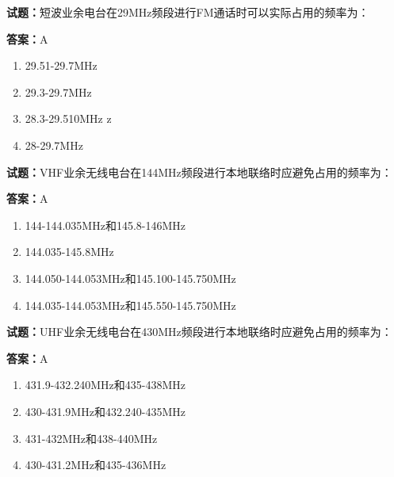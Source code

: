 \documentclass{ctexbook}
\begin{document}




\vspace{1em}

\textbf{试题：}短波业余电台在29MHz频段进行FM通话时可以实际占用的频率为： 

\textbf{答案：}A 

\begin{enumerate}[leftmargin=3em]
  \item 29.51-29.7MHz 

  \item 29.3-29.7MHz 

  \item 28.3-29.510MHz z 

  \item 28-29.7MHz 

\end{enumerate}





\vspace{1em}

\textbf{试题：}VHF业余无线电台在144MHz频段进行本地联络时应避免占用的频率为： 

\textbf{答案：}A 

\begin{enumerate}[leftmargin=3em]
  \item 144-144.035MHz和145.8-146MHz 

  \item 144.035-145.8MHz 

  \item 144.050-144.053MHz和145.100-145.750MHz 

  \item 144.035-144.053MHz和145.550-145.750MHz 

\end{enumerate}





\vspace{1em}

\textbf{试题：}UHF业余无线电台在430MHz频段进行本地联络时应避免占用的频率为： 

\textbf{答案：}A 

\begin{enumerate}[leftmargin=3em]
  \item 431.9-432.240MHz和435-438MHz 


  \item 430-431.9MHz和432.240-435MHz 

  \item 431-432MHz和438-440MHz 

  \item 430-431.2MHz和435-436MHz 

\end{enumerate}
\end{document}
